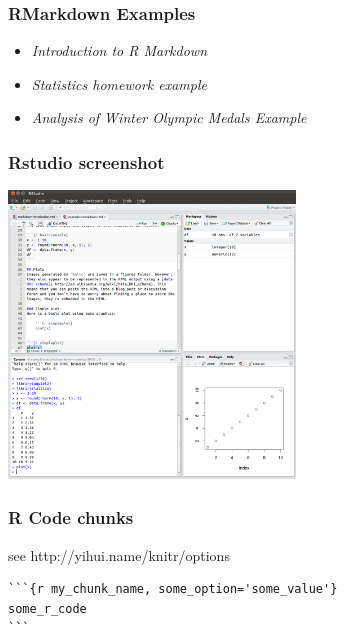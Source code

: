 \begin{frame}\frametitle{RMarkdown Examples}

\begin{itemize}
\item
  \emph{Introduction to R Markdown}
\item
  \emph{Statistics homework example}
\item
  \emph{Analysis of Winter Olympic Medals Example}
\end{itemize}

\end{frame}

\begin{frame}\frametitle{Rstudio screenshot}

\includegraphics[width=3in]{figures/rstudio-screenshot.png}

\end{frame}

\begin{frame}[fragile]\frametitle{R Code chunks}

see http://yihui.name/knitr/options

\begin{verbatim}
```{r my_chunk_name, some_option='some_value'}
some_r_code
```
\end{verbatim}

\end{frame}

